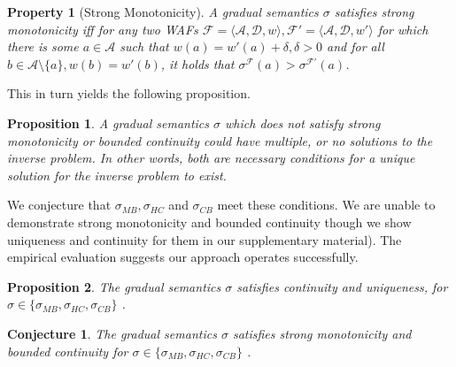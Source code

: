 \documentclass{article}
\newcommand{\AF}{\mathcal{F}}
\newcommand{\A}{\mathcal{A}}
\newcommand{\D}{\mathcal{D}}
\newtheorem{proposition}{Proposition}
\newtheorem{property}{Property}
\newtheorem{conjecture}{Conjecture}
\begin{document}
\begin{property}[Strong Monotonicity]
A gradual semantics $\sigma$ satisfies strong monotonicity iff for any two WAFs $\AF=\langle \A, \D, w \rangle, \AF'=\langle \A, \D,w'\rangle$ for which there is some $a \in \A$ such that $w(a) = w'(a) + \delta, \delta > 0$ and for all $ b \in \A \setminus \{a\}, w(b)=w'(b)$, it holds that $\sigma^\AF(a) > \sigma^{\AF'}(a)$.


\end{property}

\noindent This in turn yields the following proposition.

\begin{proposition}
\label{prop:necessary}
A gradual semantics $\sigma$ which does not satisfy strong monotonicity or bounded  continuity could have multiple, or no solutions to the inverse problem. In other words, both are necessary conditions for a unique solution for the inverse problem to exist.
\end{proposition}



We conjecture that $\sigma_{MB}, \sigma_{HC}$ and $\sigma_{CB}$ meet  these conditions. We are unable to demonstrate strong monotonicity and bounded continuity though we show uniqueness and continuity for them in our supplementary material). The empirical evaluation suggests our approach operates successfully.

\begin{proposition}
\label{conjecture:necessary}
The gradual semantics $\sigma$ satisfies continuity and uniqueness, for $\sigma \in \{ \sigma_{MB}, \sigma_{HC}, \sigma_{CB}\}$ .
\end{proposition}

\begin{conjecture}
\label{conjecture:strongmono}
The gradual semantics $\sigma$ satisfies strong monotonicity and bounded continuity for $\sigma \in \{ \sigma_{MB}, \sigma_{HC}, \sigma_{CB}\}$ .
\end{conjecture}

\end{document}
